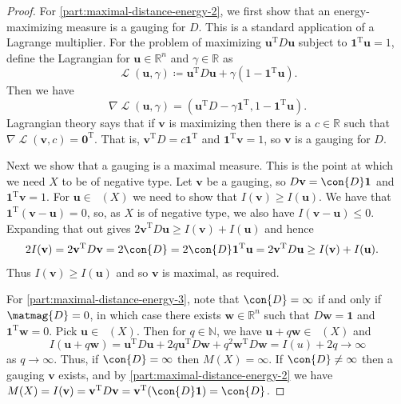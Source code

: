 \documentclass[a4paper, oneside, reqno]{amsart}
\theoremstyle{definition}
\theoremstyle{remark}
\numberwithin{equation}{section}
\renewcommand{\vec}{\mathbf}
\newcommand{\onevector}{\mathbf{1}}
\newcommand{\zerovector}{\mathbf{0}}
\newcommand{\transpose}{\mathrm{T}}
\newcommand{\R}{\mathbb{R}}
\DeclareMathOperator{\lagrangian}{\mathcal{L}}
\DeclareMathOperator{\measmassone}{\mathcal{M}_1}
\newcommand{\N}{\mathbb{N}}
\begin{document}
\begin{proof}
    For \eqref{part:maximal-distance-energy-2}, we first show that an energy-maximizing measure is a gauging for \(D\). This is a standard application of a Lagrange multiplier. For the problem of maximizing \(\vec{u}^\transpose D \vec{u}\) subject to \(\onevector^\transpose \vec{u} = 1\), define the Lagrangian for \(\vec{u} \in \R^n\) and \(\gamma \in \R\) as
    \[
        \lagrangian(\vec{u}, \gamma) 
        \coloneq
        \vec{u}^\transpose D \vec{u} + \gamma (1 - \onevector^\transpose \vec{u}).
    \]
    Then we have 
    \[
        \nabla \lagrangian(\vec{u}, \gamma)
        =
        (\vec{u}^\transpose D - \gamma \onevector^\transpose, 1 - \onevector^\transpose \vec{u}).
    \]
    Lagrangian theory says that if \(\vec{v}\) is maximizing then there is a \(c \in \R\) such that \(\nabla\lagrangian(\vec{v}, c) = \zerovector^\transpose\).  That is,
    \(
        \vec{v}^\transpose D = c \onevector^\transpose
    \)
    and
    \(
        \onevector^\transpose \vec{v} = 1
    \),
    so \(\vec{v}\) is a gauging for \(D\).

    Next we show that a gauging is a maximal measure. This is the point at which we need \(X\) to be of negative type.  Let \(\vec{v}\) be a gauging, so \(D\vec{v} = \con{D} \onevector\) and \(\onevector^\transpose \vec{v} = 1\).  For \(\vec{u} \in \measmassone(X)\) we need to show that \(I(\vec{v}) \ge I(\vec{u})\).
    We have that \(\onevector^\transpose(\vec{v} - \vec{u}) = 0\), so, as \(X\) is of negative type, we also have \(I(\vec{v} - \vec{u}) \le 0\).  Expanding that out gives \(2\vec{v}^\transpose D \vec{u} \ge I(\vec{v}) + I(\vec{u})\) and hence
    \begin{align*}
        2I(\vec{v})
        &=
        2 \vec{v}^\transpose D \vec{v} 
        = 
        2 \con{D} 
        = 
        2 \con{D} \onevector^\transpose \vec{u}
        =
        2 \vec{v}^\transpose D \vec{u}
        \ge 
        I(\vec{v}) + I(\vec{u}).
    \end{align*}
    Thus \(I(\vec{v}) \ge I(\vec{u})\) and so \(\vec{v}\) is maximal, as required.

    For \eqref{part:maximal-distance-energy-3}, note that \(\con{D} = \infty\) if and only if \(\matmag{D} = 0\), in which case there exists \(\vec{w} \in \R^n\) such that \(D\vec{w} = \onevector\) and \(\onevector^\transpose \vec{w} = 0\).  Pick \(\vec{u} \in \measmassone(X)\).  Then for \(q \in \N\), we have \(\vec{u} + q \vec{w} \in \measmassone(X)\) and 
    \[I(\vec{u} + q \vec{w}) = \vec{u}^\transpose D \vec{u} + 2 q \vec{u}^\transpose D \vec{w} + q^2 \vec{w}^\transpose D\vec{w} = I(u) + 2q \to \infty\]
    as \(q \to \infty\). Thus, if \(\con{D} = \infty\) then \(M(X) =\infty\).
    If \(\con{D} \ne \infty\) then a gauging \(\vec{v}\) exists, and by \eqref{part:maximal-distance-energy-2} we have 
    \(M(X) = I(\vec{v}) = \vec{v}^\transpose D \vec{v} = \vec{v}^\transpose (\con{D} \onevector) = \con{D}\).
\end{proof}
\end{document}
